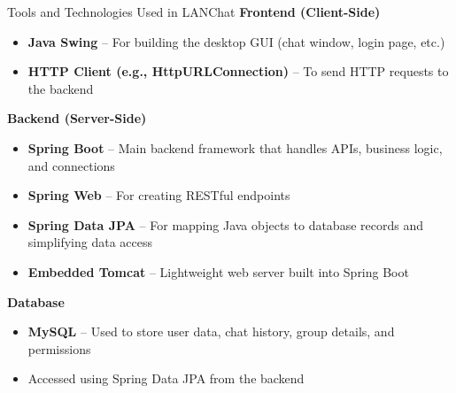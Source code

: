 \documentclass[aspectratio=1610]{beamer}
\begin{document}
\begin{frame}{Tools and Technologies Used in LANChat}
\small
\vspace{0.2cm}
\textbf{Frontend (Client-Side)}
\begin{itemize}
  \item \textbf{Java Swing} – For building the desktop GUI (chat window, login page, etc.)
  \item \textbf{HTTP Client (e.g., HttpURLConnection)} – To send HTTP requests to the backend
\end{itemize}
\vspace{0.2cm}
\textbf{Backend (Server-Side)}
\begin{itemize}
  \item \textbf{Spring Boot} – Main backend framework that handles APIs, business logic, and connections
  \item \textbf{Spring Web} – For creating RESTful endpoints
  \item \textbf{Spring Data JPA} – For mapping Java objects to database records and simplifying data access
  \item \textbf{Embedded Tomcat} – Lightweight web server built into Spring Boot
\end{itemize}
\vspace{0.2cm}
\textbf{Database}
\begin{itemize}
  \item \textbf{MySQL} – Used to store user data, chat history, group details, and permissions
  \item Accessed using Spring Data JPA from the backend
\end{itemize}
\end{frame}
\end{document}

